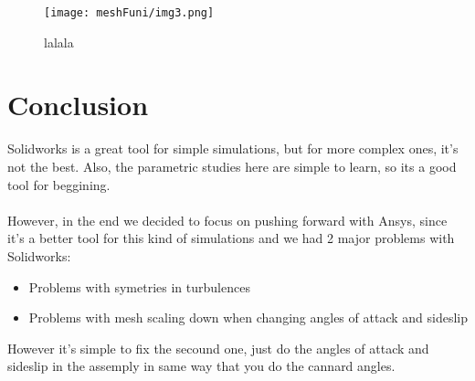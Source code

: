 \begin{figure}[H]
    \centering
    \texttt{[image: meshFuni/img3.png]}
    \caption{lalala}
\end{figure}

\section{Conclusion}
Solidworks is a great tool for simple simulations, but for more complex ones, it's not the best.
Also, the parametric studies here are simple to learn, so its a good tool for beggining. \\\\
However, in the end we decided to focus on pushing forward with Ansys, since it's a better tool for
this kind of simulations and we had 2 major problems with Solidworks:
\begin{itemize}
    \item Problems with symetries in turbulences
    \item Problems with mesh scaling down when changing angles of attack and sideslip
\end{itemize}
However it's simple to fix the secound one, just do the angles of attack and sideslip in the
assemply in same way that you do the cannard angles. 

